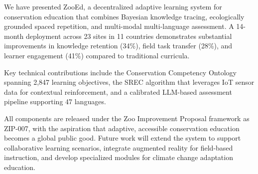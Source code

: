 \documentclass[11pt,a4paper]{article}
\begin{document}
We have presented ZooEd, a decentralized adaptive learning system for conservation education that combines Bayesian knowledge tracing, ecologically grounded spaced repetition, and multi-modal multi-language assessment.
A 14-month deployment across 23 sites in 11 countries demonstrates substantial improvements in knowledge retention (34\%), field task transfer (28\%), and learner engagement (41\%) compared to traditional curricula.

Key technical contributions include the Conservation Competency Ontology spanning 2,847 learning objectives, the SREC algorithm that leverages IoT sensor data for contextual reinforcement, and a calibrated LLM-based assessment pipeline supporting 47 languages.

All components are released under the Zoo Improvement Proposal framework as ZIP-007, with the aspiration that adaptive, accessible conservation education becomes a global public good.
Future work will extend the system to support collaborative learning scenarios, integrate augmented reality for field-based instruction, and develop specialized modules for climate change adaptation education.
\end{document}
